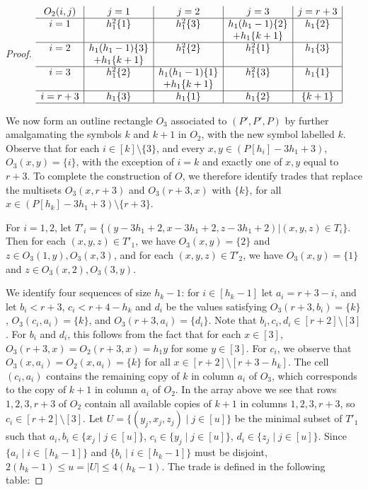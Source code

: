 \documentclass{sn-jnl}
\theoremstyle{definition}
\begin{document}
\begin{proof}
    $\begin{array}{c|c|c|c|c|}
O_2(i,j) & j=1 & j=2 & j=3 & j=r+3 \\ 
\hline
i=1 & h_1^2 \{1\} & h_1^2\{3\} & h_1(h_1-1)\{2\} & h_1\{2\} \\
&&&+h_1\{k+1\}& \\
\hline
i=2 & h_1(h_1-1)\{3\} & h_1^2\{2\} & h_1^2 \{1\} & h_1\{3\} \\
&+h_1\{k+1\}&&& \\
\hline
i=3 & h_1^2\{2\} & h_1(h_1-1)\{1\} & h_1^2\{3\} & h_1\{1\} \\
&&+h_1\{k+1\}&& \\
\hline
i=r+3 & h_1\{3\} & h_1\{1\} & h_1\{2\} & \{k+1\} \\
\hline
\end{array}$
\newline

    We now form an outline rectangle $O_3$ associated to $(P',P',P)$ by further amalgamating the symbols $k$ and $k+1$ in $O_2$, with the new symbol labelled $k$.
    Observe that for each $i \in [k]\setminus \{3\}$, and every $x,y\in (P[h_i]-3h_1+3)$, $O_3(x,y)=\{i\}$, with the exception of $i=k$ and exactly one of $x,y$ equal to $r+3$.
    To complete the construction of $O$, we therefore identify trades that replace the multisets $O_3(x,r+3)$ and $O_3(r+3,x)$ with $\{k\}$, for all $x \in (P[h_k]-3h_1+3) \setminus \{r+3\}$. 

    For $i=1,2$, let $T'_i = \{(y-3h_1+2,x-3h_1+2,z-3h_1+2) | (x,y,z) \in T_i\}$.
    Then for each $(x,y,z) \in T'_1$, we have $O_3(x,y)=\{2\}$ and $z \in O_3(1,y), O_3(x,3)$, and for each $(x,y,z) \in T'_2$, we have $O_3(x,y)=\{1\}$ and $z \in O_3(x,2), O_3(3,y)$.

    We identify four sequences of size $h_k-1$: for $i \in [h_k-1]$ let $a_{i} = r+3-i$, and let $b_i < r+3$, $c_i<r+4-h_k$ and $d_i$ be the values satisfying $O_3(r+3,b_i)=\{k\}$, $O_3(c_{i},a_{i})=\{k\}$, and $O_3(r+3,a_{i})=\{d_{i}\}$. Note that $b_i,c_i,d_i \in [r+2]\setminus [3]$. For $b_i$ and $d_i$, this follows from the fact that for each $x\in[3]$, $O_3(r+3,x)=O_2(r+3,x)=h_1{y}$ for some $y\in[3]$. For $c_i$, we observe that $O_3(x,a_i)=O_2(x,a_i)=\{k\}$ for all $x \in [r+2]\setminus [r+3-h_k]$. The cell $(c_i,a_i)$ contains the remaining copy of $k$ in column $a_i$ of $O_3$, which corresponds to the copy of $k+1$ in column $a_i$ of $O_2$. In the array above we see that rows $1,2,3,r+3$ of $O_2$ contain all available copies of $k+1$ in columns $1,2,3,r+3$, so $c_i\in [r+2]\setminus [3]$.
    Let $U = \{(y_j,x_j,z_j) \mid j \in [u]\}$ be the minimal subset of $T'_1$ such that $a_i, b_i \in \{x_j \mid j \in [u]\}$, $c_i \in \{y_j \mid j \in [u]\}$, $d_i \in \{z_j \mid j \in [u]\}$. Since $\{a_i \mid i \in [h_k-1]\}$ and $\{b_i \mid i \in [h_k-1]\}$ must be disjoint, $2(h_k-1) \le u=|U| \le 4(h_k-1)$. The trade is defined in the following table:
    \newline


\end{proof}
\end{document}
